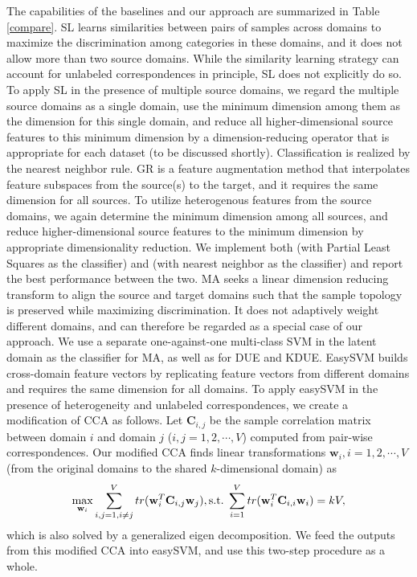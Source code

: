 \documentclass[10pt,twocolumn,letterpaper]{article}
\begin{document}
The capabilities of the baselines and our approach are summarized in Table \ref{compare}. SL learns similarities between pairs of samples across domains to maximize the discrimination among categories in these domains, and it does not allow more than two source domains. While the similarity learning strategy can account for unlabeled correspondences in principle, SL does not explicitly do so. To apply SL in the presence of multiple source domains, we regard the multiple source domains as a single domain, use the minimum dimension among them as the dimension for this single domain, and reduce all higher-dimensional source features to this minimum dimension by a dimension-reducing operator that is appropriate for each dataset (to be discussed shortly).  Classification is realized by the nearest neighbor rule. GR is a feature augmentation method that interpolates feature subspaces from the source(s) to the target, and it requires the same dimension for all sources.  To utilize heterogenous features from the source domains, we again determine the minimum dimension among all sources, and reduce higher-dimensional source features to the minimum dimension by appropriate dimensionality reduction. We implement both \cite{Gopalan:Grassmann} (with Partial Least Squares as the classifier) and \cite{Gong:Grassmann} (with nearest neighbor as the classifier) and report the best performance between the two. MA seeks a linear dimension reducing transform to align the source and target domains such that the sample topology is preserved while maximizing discrimination. It does not adaptively weight different domains, and can therefore be regarded as a special case of our approach. We use a separate one-against-one multi-class SVM in the latent domain as the classifier for MA, as well as for DUE and KDUE. EasySVM builds cross-domain feature vectors by replicating feature vectors from different domains and requires the same dimension for all domains. To apply easySVM in the presence of heterogeneity and unlabeled correspondences, we create a modification of CCA as follows. Let $\mathbf{C}_{i,j}$ be the sample correlation matrix between domain $i$ and domain $j$ ($i,j=1,2,\cdots,V$) computed from pair-wise correspondences. Our modified CCA finds linear transformations $\mathbf{w}_{i}, i=1,2,\cdots,V$ (from the original domains to the shared $k$-dimensional domain) as
\begin{equation}
\label{multiCCA}
\max_{\mathbf{w}_{i}}\sum_{i,j=1,i\ne j}^{V}tr(\mathbf{w}_{i}^{T}\mathbf{C}_{i,j}\mathbf{w}_{j}),  \textup{s.t.}\hspace{3pt}\sum_{i=1}^{V}tr(\mathbf{w}_{i}^{T}\mathbf{C}_{i,i}\mathbf{w}_{i})=kV,
\end{equation}
which is also solved by a generalized eigen decomposition. We feed the outputs from this modified CCA into easySVM, and use this two-step procedure as a whole.
\end{document}
